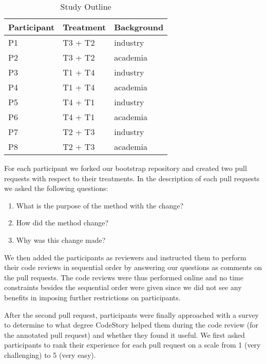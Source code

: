 \documentclass[../manifest.tex]{subfiles}
\begin{document}
\begin{table*}[t]
    \label{tab:study-outline}
    \centering
    \begin{threeparttable}
    \begin{tabular*}{\textwidth}{lll}
    \hline
    \textbf{Participant} & \textbf{Treatment} & \textbf{Background} \\
    \hline
    P1 & T3 + T2 & industry \\
    P2 & T3 + T2 & academia \\
    P3 & T1 + T4 & industry \\
    P4 & T1 + T4 & academia \\
    P5 & T4 + T1 & industry \\
    P6 & T4 + T1 & academia \\
    P7 & T2 + T3 & industry \\
    P8 & T2 + T3 & academia \\
    \hline
    \end{tabular*}
    \end{threeparttable}
    \caption{Study Outline}
\end{table*}

For each participant we forked our bootstrap repository and created two pull requests with respect to their treatments. In the description of each pull requests we asked the following questions:
\begin{enumerate}
  \item What is the purpose of the method with the change?
  \item How did the method change?
  \item Why was this change made?
\end{enumerate}

We then added the participants as reviewers and instructed them to perform their code reviews in sequential order by answering our questions as comments on the pull requests. The code reviews were thus performed online and no time constraints besides the sequential order were given since we did not see any benefits in imposing further restrictions on participants.

After the second pull request, participants were finally approached with a survey to determine to what degree CodeStory helped them during the code review (for the annotated pull request) and whether they found it useful. We first asked participants to rank their experience for each pull request on a scale from 1 (very challenging) to 5 (very easy). 
\end{document}
